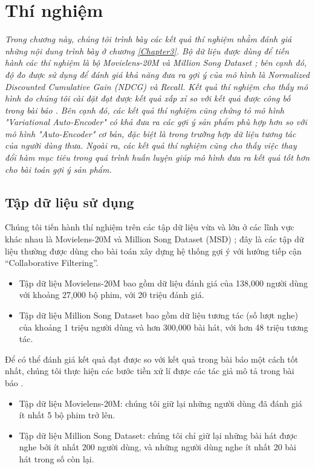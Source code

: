 \chapter{Thí nghiệm}
\label{Chapter4}
\graphicspath{{Chapter4/Chapter4Figs}}
\textit{Trong chương này, chúng tôi trình bày các kết quả thí nghiệm nhằm đánh giá những nội dung trình bày ở chương \ref{Chapter3}. Bộ dữ liệu được dùng để tiến hành các thí nghiệm là bộ Movielens-20M \cite{Ml20M} và Million Song Dataset \cite{MSD}; bên cạnh đó, độ đo được sử dụng để đánh giá khả năng đưa ra gợi ý của mô hình là Normalized Discounted Cumulative Gain (NDCG) và  Recall. Kết quả thí nghiệm cho thấy mô hình do chúng tôi cài đặt đạt được kết quả xấp xỉ so với kết quả được công bố trong bài báo \cite{mvae}. Bên cạnh đó, các kết quả thí nghiệm cũng chứng tỏ mô hình "Variational Auto-Encoder" có khả đưa ra các gợi ý sản phẩm phù hợp hơn so với mô hình "Auto-Encoder" cơ bản, đặc biệt là trong trường hợp dữ liệu tương tác của người dùng thưa. Ngoài ra, các kết quả thí nghiệm cũng cho thấy việc thay đổi hàm mục tiêu trong quá trình huấn luyện giúp mô hình đưa ra kết quả tốt hơn cho bài toán gợi ý sản phẩm.}


\section{Tập dữ liệu sử dụng}
\label{chap4sec1}
Chúng tôi tiến hành thí nghiệm trên các tập dữ liệu vừa và lớn ở các lĩnh vực khác nhau là Movielens-20M \cite{Ml20M} 
và Million Song Dataset (MSD) \cite{MSD}; đây là các tập dữ liệu thường được dùng cho bài toán xây dựng hệ thống gợi ý
với hướng tiếp cận ``Collaborative Filtering''. 
\begin{itemize}
    \item Tập dữ liệu Movielens-20M bao gồm dữ liệu đánh giá của 138,000 người dùng với khoảng 27,000 bộ phim,
    với 20 triệu đánh giá.
    \item Tập dữ liệu Million Song Dataset bao gồm dữ liệu tương tác (số lượt nghe) của khoảng 1 triệu người dùng và hơn 300,000 bài hát, với hơn 48 triệu tương tác.
\end{itemize}

Để có thể đánh giá kết quả đạt được so với kết quả trong bài báo \cite{mvae} một cách tốt nhất,
chúng tôi thực hiện các bước tiền xử lí được các tác giả mô tả trong bài báo \cite{mvae}.
\begin{itemize}
    \item Tập dữ liệu Movielens-20M: chúng tôi giữ lại những người dùng đã đánh giá ít nhất 5 bộ phim trở lên. 
    \item Tập dữ liệu Million Song Dataset: chúng tôi chỉ giữ lại những bài hát được nghe bởi ít nhất 200 người dùng, và những người dùng nghe ít nhất 20 bài hát trong số còn lại.
\end{itemize}

